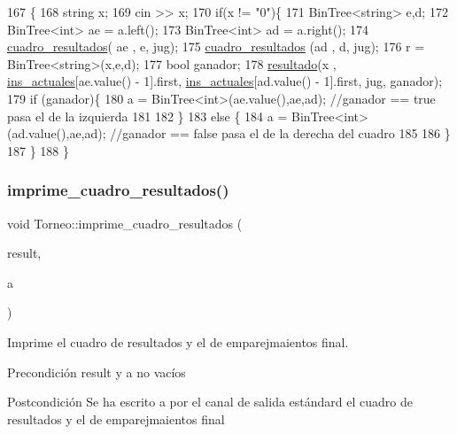 \begin{DoxyCode}
167 \{
168   \textcolor{keywordtype}{string} x;
169   cin >> x;
170   \textcolor{keywordflow}{if}(x != \textcolor{stringliteral}{"0"})\{
171     BinTree<string> e,d;
172     BinTree<int> ae = a.left();
173     BinTree<int> ad = a.right();
174     \hyperlink{class_torneo_a64eda02f7720674f1808521d5547c02a}{cuadro\_resultados}( ae , e, jug);
175     \hyperlink{class_torneo_a64eda02f7720674f1808521d5547c02a}{cuadro\_resultados} (ad , d, jug);
176     r = BinTree<string>(x,e,d);
177     \textcolor{keywordtype}{bool} ganador;
178     \hyperlink{class_torneo_ad3d497cf4a6eafce2c36160f464bbe03}{resultado}(x , \hyperlink{class_torneo_a2293acd2d9d04bdefc603ab4cdce2c5a}{ins\_actuales}[ae.value() - 1].first, 
      \hyperlink{class_torneo_a2293acd2d9d04bdefc603ab4cdce2c5a}{ins\_actuales}[ad.value() - 1].first, jug, ganador);
179     \textcolor{keywordflow}{if} (ganador)\{
180       a = BinTree<int>(ae.value(),ae,ad); \textcolor{comment}{//ganador == true pasa el de la izquierda}
181       
182     \} 
183     \textcolor{keywordflow}{else} \{
184       a = BinTree<int>(ad.value(),ae,ad);  \textcolor{comment}{//ganador == false pasa el de la derecha del cuadro}
185       
186     \} 
187   \}
188 \}
\end{DoxyCode}
\mbox{\label{class_torneo_aa42b2460bffdc5e1e85f7ebff4a5a6d0}} 
\subsubsection{\texorpdfstring{imprime\+\_\+cuadro\+\_\+resultados()}{imprime\_cuadro\_resultados()}}
{\footnotesize\ttfamily void Torneo\+::imprime\+\_\+cuadro\+\_\+resultados (\begin{DoxyParamCaption}\item[{const Bin\+Tree$<$ string $>$ \&}]{result,  }\item[{const Bin\+Tree$<$ int $>$ \&}]{a }\end{DoxyParamCaption})\hspace{0.3cm}{\ttfamily [private]}}



Imprime el cuadro de resultados y el de emparejmaientos final. 

\begin{DoxyPrecond}{Precondición}
result y a no vacíos 
\end{DoxyPrecond}
\begin{DoxyPostcond}{Postcondición}
Se ha escrito a por el canal de salida estándard el cuadro de resultados y el de emparejmaientos final 
\end{DoxyPostcond}


